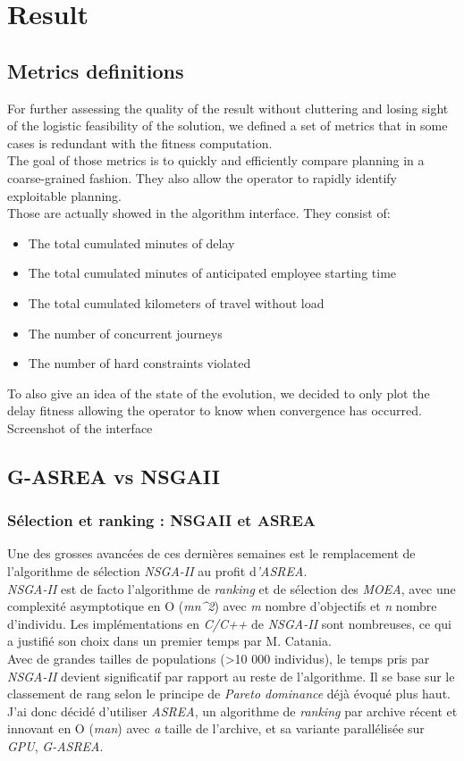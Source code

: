 \documentclass[12pt]{memoir}
\begin{document}
\section{Result}
\subsection{Metrics definitions}
For further assessing the quality of the result without cluttering and losing sight of the logistic feasibility of the solution, we defined a set of metrics that in some cases is redundant with the fitness computation. \\
The goal of those metrics is to quickly and efficiently compare planning in a coarse-grained fashion. They also allow the operator to rapidly identify exploitable planning.\\
Those are actually showed in the algorithm interface. They consist of: 
\begin{itemize}
  \item The total cumulated minutes of delay
  \item The total cumulated minutes of anticipated employee starting time
  \item The total cumulated kilometers of travel without load
  \item The number of concurrent journeys
  \item The number of hard constraints violated
\end{itemize}
To also give an idea of the state of the evolution, we decided to only plot the delay
fitness allowing the operator to know when convergence has occurred.
Screenshot of the interface
\subsection{G-ASREA vs NSGAII}
\subsubsection{Sélection et ranking : NSGAII et
	ASREA}\label{suxe9lection-et-ranking-nsgaii-et-asrea}

Une des grosses avancées de ces dernières semaines est le remplacement
de l'algorithme de sélection \emph{NSGA-II\cite{deb2002fast}} au profit d\emph{'ASREA\cite{sharma2010archived,tsutsui2013massively}}.\\
\emph{NSGA-II} est de facto l'algorithme de \emph{ranking} et de
sélection des \emph{MOEA}, avec une complexité asymptotique en O
(\emph{mn\^{}2}) avec \emph{m} nombre d'objectifs et \emph{n} nombre
d'individu. Les implémentations en \emph{C/C++} de \emph{NSGA-II} sont
nombreuses, ce qui a justifié son choix dans un premier temps par M.
Catania.\\
Avec de grandes tailles de populations (\textgreater{}10 000
individus), le temps pris par \textit{NSGA-II} devient significatif par
rapport au reste de l'algorithme. Il se base sur le classement de rang
selon le principe de \textit{Pareto dominance} déjà évoqué plus haut. J'ai donc
décidé d'utiliser \textit{ASREA}, un algorithme de \textit{ranking} par archive
récent et innovant en O (\emph{man}) avec \emph{a} taille de l'archive,
et sa variante parallélisée sur \emph{GPU}, \emph{G-ASREA\cite{sharma2010gpgpu}}.
\end{document}
